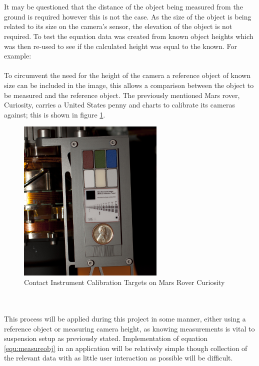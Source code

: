 	\\\\
	It may be questioned that the distance of the object being measured from the ground is required however this is not the case. As the size of the object is being related to its size on the camera's sensor, the elevation of the object is not required. To test the equation data was created from known object heights which was then re-used to see if the calculated height was equal to the known. For example:
	\\\\
	To circumvent the need for the height of the camera a reference object of known size can be included in the image, this allows a comparison between the object to be measured and the reference object. The previously mentioned Mars rover, Curiosity, carries a United States penny and charts to calibrate its cameras against; this is shown in figure \ref{fig:curiosity_calibration_chart}.
	\begin{figure}[h!]
		\centering
		\includegraphics[width=7cm]{../images/curiosity_calibration_chart.jpg}
		\caption{Contact Instrument Calibration Targets on Mars Rover Curiosity \citep{curiosity_image_calibration}}
		\label{fig:curiosity_calibration_chart}
	\end{figure} 
	\\\\
	This process will be applied during this project in some manner, either using a reference object or measuring camera height, as knowing measurements is vital to suspension setup as previously stated. Implementation of equation \ref{equ:measureobj} in an application will be relatively simple though collection of the relevant data with as little user interaction as possible will be difficult.